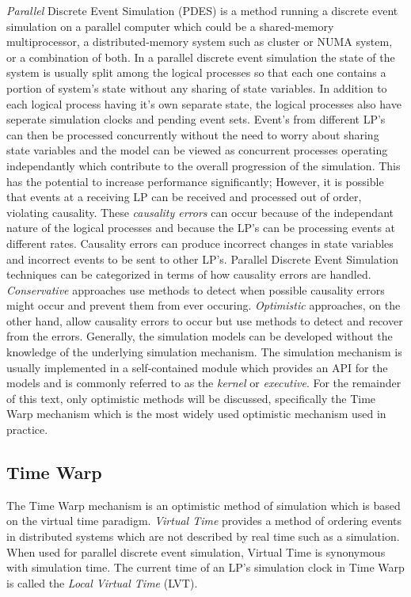 \documentclass[11pt]{book}
\begin{document}
\emph{Parallel} Discrete Event Simulation (PDES) is a method running a discrete event simulation
on a parallel computer which could be a shared-memory multiprocessor, a distributed-memory system
such as cluster or NUMA system, or a combination of both. In a parallel discrete event simulation
the state of the system is usually split among the logical processes so that each one
contains a portion of system's state without any sharing of state variables\cite{fujimoto-90}.
In addition to each logical process having it's own separate state, the logical processes also
have seperate simulation clocks and pending event sets. Event's from different LP's can then be
processed concurrently without the need to worry about sharing state variables and the model can
be viewed as concurrent processes operating independantly which contribute to the overall
progression of the simulation. This has the potential to increase performance significantly;
However, it is possible that events at a receiving LP can be received and processed out of
order, violating causality. These \emph{causality errors} can occur because of the independant
nature of the logical processes and because the LP's can be processing events at different rates.
Causality errors can produce incorrect changes in state variables and incorrect events to be sent
to other LP's. Parallel Discrete Event Simulation techniques can be categorized in terms of how
causality errors are handled. \emph{Conservative} approaches use methods to detect when possible
causality errors might occur and prevent them from ever occuring. \emph{Optimistic} approaches, on
the other hand, allow causality errors to occur but use methods to detect and recover from the errors.
Generally, the simulation models can be developed without the knowledge of the underlying simulation
mechanism. The simulation mechanism is usually implemented in a self-contained module which provides
an API for the models and is commonly referred to as the \emph{kernel} or \emph{executive}.
For the remainder of this text, only optimistic methods will be discussed, specifically the Time
Warp mechanism which is the most widely used optimistic mechanism used in practice.

\subsection{Time Warp}

The Time Warp mechanism is an optimistic method of simulation which is based on the virtual time
paradigm\cite{jefferson-85}. \emph{Virtual Time} provides a method of ordering events in distributed
systems which are not described by real time such as a simulation. When used for parallel discrete
event simulation, Virtual Time is synonymous with simulation time. The current time of an LP's
simulation clock in Time Warp is called the \emph{Local Virtual Time} (LVT).
\end{document}
